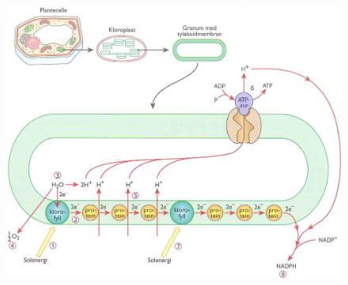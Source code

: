 \begin{figure}[H]
\centering
\includegraphics[width=\textwidth]{img/photosynthesis/light_dependent.png}
\end{figure}
\newpage